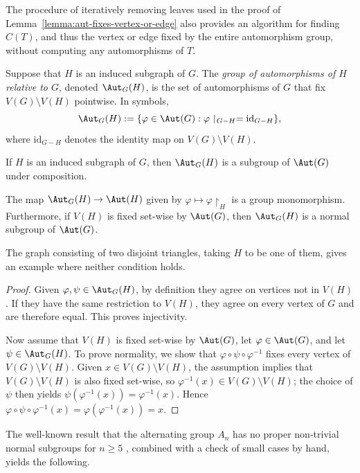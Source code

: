 The procedure of iteratively removing leaves used in the proof of Lemma~\ref{lemma:aut-fixes-vertex-or-edge} also provides an algorithm for finding $C(T)$, and thus the vertex or edge fixed by the entire automorphism group, without computing any automorphisms of $T$.

\begin{definition}\label{def:relative-aut}
    Suppose that $H$ is an induced subgraph of $G$.
    The \emph{group of automorphisms of $H$ relative to $G$}, denoted $\Aut_G(H)$, is the set of automorphisms of $G$ that fix $V(G)\setminus V(H)$ pointwise.
    In symbols,
    $$
        \Aut_G(H):=\{\varphi\in\Aut(G):\varphi\restriction_{G-H}=\mathrm{id}_{G-H}\},
    $$
    where $\mathrm{id}_{G-H}$ denotes the identity map on $V(G)\setminus V(H)$.
\end{definition}

If $H$ is an induced subgraph of $G$, then $\Aut_G(H)$ is a subgroup of $\Aut(G)$ under composition.

\begin{lemma}\label{lemma:relative}
    The map $\Aut_G(H)\to\Aut(H)$ given by $\varphi\mapsto\varphi\restriction_H$ is a group monomorphism.
    Furthermore, if $V(H)$ is fixed set-wise by $\Aut(G)$, then $\Aut_G(H)$ is a normal subgroup of $\Aut(G)$.
\end{lemma}

The graph consisting of two disjoint triangles, taking $H$ to be one of them, gives an example where neither condition holds.

\begin{proof}
    Given $\varphi,\psi\in\Aut_G(H)$, by definition they agree on vertices not in $V(H)$.
    If they have the same restriction to $V(H)$, they agree on every vertex of $G$ and are therefore equal.
    This proves injectivity.

    Now assume that $V(H)$ is fixed set-wise by $\Aut(G)$, let $\varphi\in\Aut(G)$, and let $\psi\in\Aut_G(H)$.
    To prove normality, we show that $\varphi\circ\psi\circ\varphi^{-1}$ fixes every vertex of $V(G)\setminus V(H)$.
    Given $x\in V(G)\setminus V(H)$, the assumption implies that $V(G)\setminus V(H)$ is also fixed set-wise, so $\varphi^{-1}(x)\in V(G)\setminus V(H)$; the choice of $\psi$ then yields $\psi(\varphi^{-1}(x))=\varphi^{-1}(x)$.
    Hence $\varphi\circ\psi\circ\varphi^{-1}(x)=\varphi(\varphi^{-1}(x))=x$.
\end{proof}

The well-known result that the alternating group $A_n$ has no proper non-trivial normal subgroups for $n\geq 5$ \cite[Section~3.5]{dummit_foote_abstract_algebra}, combined with a check of small cases by hand, yields the following.

